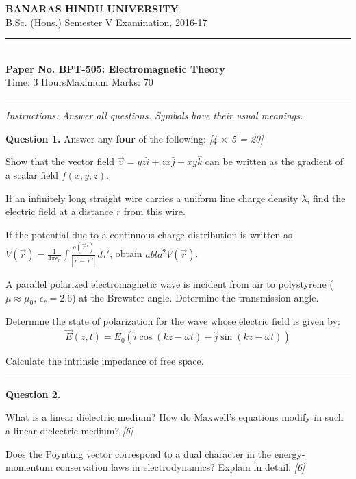 \documentclass[11pt,a4paper]{article}
\newcommand{\pts}[1]{\hfill   \textit{[#1]}}
\begin{document}
\begin{center}
  {\large\bfseries BANARAS HINDU UNIVERSITY}\\[2pt]
  {\normalsize B.Sc. (Hons.) Semester V Examination, 2016-17}\\[6pt]
  \rule{0.8\linewidth}{0.5pt}\\[6pt]
  {\large\bfseries Paper No. BPT-505: Electromagnetic Theory}\\[4pt]
  {\normalsize Time: 3 Hours\hfill Maximum Marks: 70}
\end{center}
\rule{\linewidth}{0.4pt}
\smallskip



\noindent   \textit{Instructions: Answer all questions. Symbols have their usual meanings.}
\bigskip




\noindent   \textbf{Question 1.} Answer any   \textbf{four} of the following: \pts{4 $ \times$ 5 = 20}

\begin{parts}
  \item Show that the vector field $\vec{v} = yz \hat{i} + zx \hat{j} + xy \hat{k}$ can be written as the gradient of a scalar field $f(x, y, z)$.
  \item If an infinitely long straight wire carries a uniform line charge density $\lambda$, find the electric field at a distance $r$ from this wire.
  \item If the potential due to a continuous charge distribution is written as $V(\vec{r}) = \frac{1}{4\pi\epsilon_0} \int \frac{\rho(\vec{r}')}{|\vec{r} - \vec{r}'|} \, d \tau'$, obtain $
abla^2 V(\vec{r})$.
  \item A parallel polarized electromagnetic wave is incident from air to polystyrene ($\mu \approx \mu_0$, $\epsilon_r = 2.6$) at the Brewster angle. Determine the transmission angle.
  \item Determine the state of polarization for the wave whose electric field is given by:
    \[ \vec{E}(z,t) = E_0 ( \hat{i} \cos(kz - \omega t) - \hat{j} \sin(kz - \omega t) ) \]
  \item Calculate the intrinsic impedance of free space.
\end{parts}

\medskip\rule{\linewidth}{0.2pt}




\noindent   \textbf{Question 2.}

\begin{parts}
  \item What is a linear dielectric medium? How do Maxwell's equations modify in such a linear dielectric medium? \pts{6}
  \item Does the Poynting vector correspond to a dual character in the energy-momentum conservation laws in electrodynamics? Explain in detail. \pts{6}
\end{parts}
\end{document}
